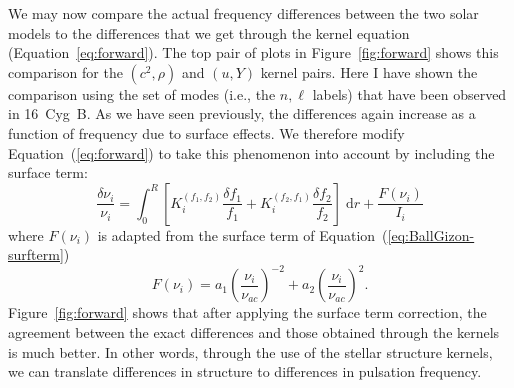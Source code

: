 We may now compare the actual frequency differences between the two solar models to the differences that we get through the kernel equation (Equation~\ref{eq:forward}). 
The top pair of plots in Figure~\ref{fig:forward} shows this comparison for the ${(c^2, \rho)}$ and ${(u, Y)}$ kernel pairs. 
Here I have shown the comparison using the set of modes (i.e., the ${n,\ell}$ labels) that have been observed in 16~Cyg~B. 
As we have seen previously, the differences again increase as a function of frequency due to surface effects. 
We therefore modify Equation~(\ref{eq:forward}) to take this phenomenon into account by including the \citet{2014A&A...568A.123B} surface term: 
\begin{equation} \label{eq:forward-surf} \boxed{
  \frac{\delta\nu_i}{\nu_i} 
  = 
  \int_0^R \left[ K_i^{(f_1, f_2)} \frac{\delta f_1}{f_1}
                + K_i^{(f_2, f_1)} \frac{\delta f_2}{f_2}
          \right] \; \text{d}r
    + \frac{F(\nu_i)}{I_i}
}\end{equation}
where ${F(\nu_i)}$ is adapted from the surface term of Equation~(\ref{eq:BallGizon-surfterm})
\begin{equation}
    F(\nu_i) %
    = 
    a_1 \left( \frac{\nu_i}{\nu_{ac}} \right)^{-2} + a_2 \left( \frac{\nu_i}{\nu_{ac}} \right)^{2}.
\end{equation}
Figure~\ref{fig:forward} shows that after applying the surface term correction, the agreement between the exact differences and those obtained through the kernels is much better. 
In other words, through the use of the stellar structure kernels, we can translate differences in structure to differences in pulsation frequency. 

